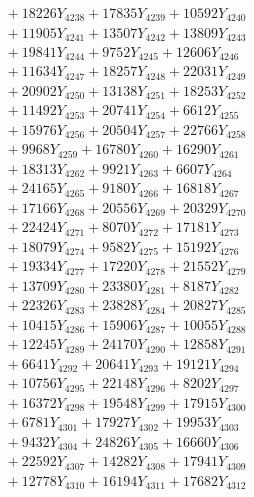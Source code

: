 \documentclass[a4paper,10pt]{article}
\begin{document}
{\begin{align}
&\;  + 18226 Y_{4238} + 17835 Y_{4239} + 10592 Y_{4240} \\[0.3ex]
&\;  + 11905 Y_{4241} + 13507 Y_{4242} + 13809 Y_{4243} \\[0.3ex]
&\;  + 19841 Y_{4244} + 9752 Y_{4245} + 12606 Y_{4246} \\[0.3ex]
&\;  + 11634 Y_{4247} + 18257 Y_{4248} + 22031 Y_{4249} \\[0.3ex]
&\;  + 20902 Y_{4250} + 13138 Y_{4251} + 18253 Y_{4252} \\[0.3ex]
&\;  + 11492 Y_{4253} + 20741 Y_{4254} + 6612 Y_{4255} \\[0.3ex]
&\;  + 15976 Y_{4256} + 20504 Y_{4257} + 22766 Y_{4258} \\[0.5ex]\allowbreak
&\;  + 9968 Y_{4259} + 16780 Y_{4260} + 16290 Y_{4261} \\[0.3ex]
&\;  + 18313 Y_{4262} + 9921 Y_{4263} + 6607 Y_{4264} \\[0.3ex]
&\;  + 24165 Y_{4265} + 9180 Y_{4266} + 16818 Y_{4267} \\[0.3ex]
&\;  + 17166 Y_{4268} + 20556 Y_{4269} + 20329 Y_{4270} \\[0.3ex]
&\;  + 22424 Y_{4271} + 8070 Y_{4272} + 17181 Y_{4273} \\[0.3ex]
&\;  + 18079 Y_{4274} + 9582 Y_{4275} + 15192 Y_{4276} \\[0.3ex]
&\;  + 19334 Y_{4277} + 17220 Y_{4278} + 21552 Y_{4279} \\[0.3ex]
&\;  + 13709 Y_{4280} + 23380 Y_{4281} + 8187 Y_{4282} \\[0.3ex]
&\;  + 22326 Y_{4283} + 23828 Y_{4284} + 20827 Y_{4285} \\[0.3ex]
&\;  + 10415 Y_{4286} + 15906 Y_{4287} + 10055 Y_{4288} \\[0.5ex]\allowbreak
&\;  + 12245 Y_{4289} + 24170 Y_{4290} + 12858 Y_{4291} \\[0.3ex]
&\;  + 6641 Y_{4292} + 20641 Y_{4293} + 19121 Y_{4294} \\[0.3ex]
&\;  + 10756 Y_{4295} + 22148 Y_{4296} + 8202 Y_{4297} \\[0.3ex]
&\;  + 16372 Y_{4298} + 19548 Y_{4299} + 17915 Y_{4300} \\[0.3ex]
&\;  + 6781 Y_{4301} + 17927 Y_{4302} + 19953 Y_{4303} \\[0.3ex]
&\;  + 9432 Y_{4304} + 24826 Y_{4305} + 16660 Y_{4306} \\[0.3ex]
&\;  + 22592 Y_{4307} + 14282 Y_{4308} + 17941 Y_{4309} \\[0.3ex]
&\;  + 12778 Y_{4310} + 16194 Y_{4311} + 17682 Y_{4312} \\[0.3ex]

\end{align}}
\end{document}

